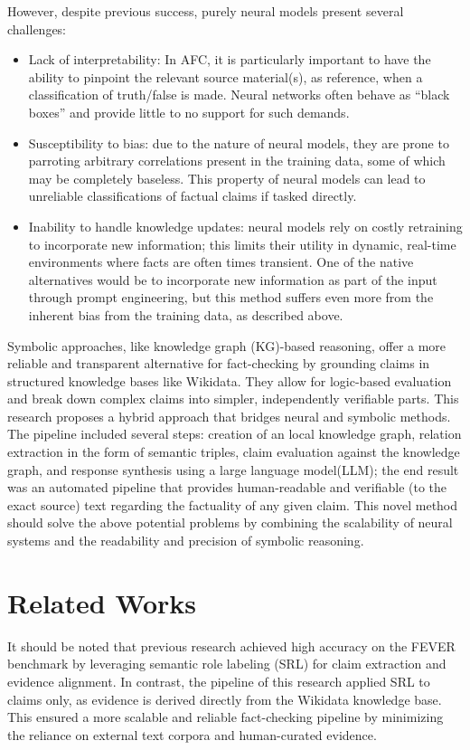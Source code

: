 \documentclass[11pt]{article}
\begin{document}
However, despite previous success, purely neural models present several challenges:
\begin{itemize}
    \item Lack of interpretability: In AFC, it is particularly important to have the ability to pinpoint the relevant source material(s), as reference, when a classification of truth/false is made. Neural networks often behave as “black boxes” and provide little to no support for such demands. 
    \item Susceptibility to bias: due to the nature of neural models, they are prone to parroting arbitrary correlations present in the training data, some of which may be completely baseless. This property of neural models can lead to unreliable classifications of factual claims if tasked directly. 
    \item Inability to handle knowledge updates: neural models rely on costly retraining to incorporate new information; this limits their utility in dynamic, real-time environments where facts are often times transient. One of the native alternatives would be to incorporate new information as part of the input through prompt engineering, but this method suffers even more from the inherent bias from the training data, as described above. 
\end{itemize}

Symbolic approaches, like knowledge graph (KG)-based reasoning, offer a more reliable and transparent alternative for fact-checking by grounding claims in structured knowledge bases like Wikidata. They allow for logic-based evaluation and break down complex claims into simpler, independently verifiable parts.
This research proposes a hybrid approach that bridges neural and symbolic methods. The pipeline included several steps: creation of an local knowledge graph, relation extraction in the form of semantic triples, claim evaluation against the knowledge graph, and response synthesis using a large language model(LLM); the end result was an automated pipeline that provides human-readable and verifiable (to the exact source) text regarding the factuality of any given claim. This novel method should solve the above potential problems by combining the scalability of neural systems and the readability and precision of symbolic reasoning. 

\section{Related Works}
It should be noted that previous research \cite{zhong} achieved high accuracy on the FEVER benchmark by leveraging semantic role labeling (SRL) for claim extraction and evidence alignment. In contrast, the pipeline of this research applied SRL to claims only, as evidence is derived directly from the Wikidata knowledge base. This ensured a more scalable and reliable fact-checking pipeline by minimizing the reliance on external text corpora and human-curated evidence.
\end{document}
